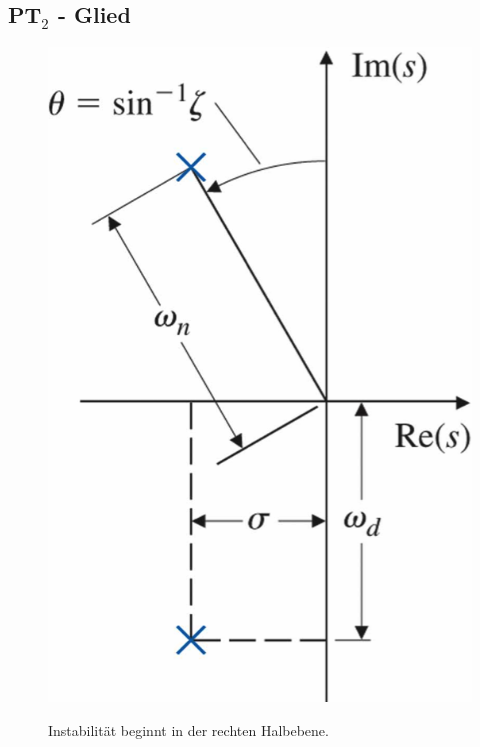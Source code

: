 \subsection{PT$_2$ - Glied}
\begin{tcolorbox}[colback=white!10!white,
                  colframe=green!30!black,
                  title=PT$_2$ - Glied] 
    \begin{figure}[H]
        \begin{minipage}{.3\textwidth}
            \centering
            \includegraphics[width=1\textwidth]{images/winkel}
        \end{minipage}%
        \hspace{0.05\textwidth}
        \begin{minipage}{.65\textwidth}
            Instabilität beginnt in der rechten Halbebene. 
            

\end{minipage}
\end{figure}
\end{tcolorbox}
